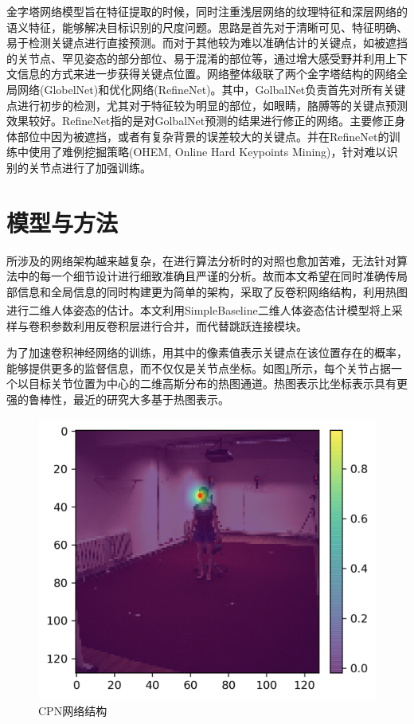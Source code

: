 金字塔网络模型旨在特征提取的时候，同时注重浅层网络的纹理特征和深层网络的语义特征，能够解决目标识别的尺度问题。思路是首先对于清晰可见、特征明确、易于检测关键点进行直接预测。而对于其他较为难以准确估计的关键点，如被遮挡的关节点、罕见姿态的部分部位、易于混淆的部位等，通过增大感受野并利用上下文信息的方式来进一步获得关键点位置。网络整体级联了两个金字塔结构的网络全局网络(GlobelNet)和优化网络(RefineNet)。其中，GolbalNet负责首先对所有关键点进行初步的检测，尤其对于特征较为明显的部位，如眼睛，胳膊等的关键点预测效果较好。RefineNet指的是对GolbalNet预测的结果进行修正的网络。主要修正身体部位中因为被遮挡，或者有复杂背景的误差较大的关键点。并在RefineNet的训练中使用了难例挖掘策略(OHEM, Online Hard Keypoints Mining)，针对难以识别的关节点进行了加强训练。


\section{模型与方法}
所涉及的网络架构越来越复杂，在进行算法分析时的对照也愈加苦难，无法针对算法中的每一个细节设计进行细致准确且严谨的分析。故而本文希望在同时准确传局部信息和全局信息的同时构建更为简单的架构，采取了反卷积网络结构，利用热图进行二维人体姿态的估计。本文利用SimpleBaseline二维人体姿态估计模型\textsuperscript{\cite{p25}}将上采样与卷积参数利用反卷积层进行合并，而代替跳跃连接模块。

为了加速卷积神经网络的训练，用其中的像素值表示关键点在该位置存在的概率，能够提供更多的监督信息，而不仅仅是关节点坐标。如图\ref{fig:f18}所示，每个关节占据一个以目标关节位置为中心的二维高斯分布的热图通道。热图表示比坐标表示具有更强的鲁棒性，最近的研究大多基于热图表示。

\begin{figure}[h]
	\centering
	\includegraphics[scale=0.4]{figures/18.png}
	\caption{CPN网络结构}
	\label{fig:f18}
\end{figure}

